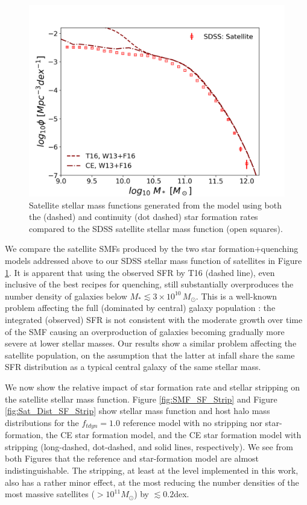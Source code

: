 \begin{figure}
	\centering
	\includegraphics[width = \linewidth]{Figures/Chapter3/Fig9.png}
	\caption{Satellite stellar mass functions generated from the model using both the \citet{Tomczak2016THE4} (dashed) and continuity (dot dashed) star formation rates compared to the SDSS satellite stellar mass function (open squares).}
	\label{fig:SMF_SF_Q}
\end{figure}

We compare the satellite SMFs produced by the two star formation+quenching models addressed above to our SDSS stellar mass function of satellites in Figure \ref{fig:SMF_SF_Q}. It is apparent that using the observed SFR by T16 (dashed line), even inclusive of the best recipes for quenching, still substantially overproduces the number density of galaxies below $M_* \lesssim 3\times 10^{10}\, M_{\odot}$. This is a well-known problem affecting the full (dominated by central) galaxy population \citep[e.g.,][]{Leja2015ReconcilingFunction}: the integrated (observed) SFR is not consistent with the moderate growth over time of the SMF causing an overproduction of galaxies becoming gradually more severe at lower stellar masses. Our results show a similar problem affecting the satellite population, on the assumption that the latter at infall share the same SFR distribution as a typical central galaxy of the same stellar mass.


We now show the relative impact of star formation rate and stellar stripping on the satellite stellar mass function. Figure \ref{fig:SMF_SF_Strip} and Figure \ref{fig:Sat_Dist_SF_Strip} show stellar mass function and host halo mass distributions for the $f_{tdyn} = 1.0$ reference model with no stripping nor star-formation, the CE star formation model, and the CE star formation model with stripping (long-dashed, dot-dashed, and solid lines, respectively). We see from both Figures that the reference and star-formation model are almost indistinguishable. The stripping, at least at the level implemented in this work, also has a rather minor effect, at the most reducing the number densities of the most massive satellites ($>10^{11}M_{\odot}$) by $\lesssim 0.2$dex.


